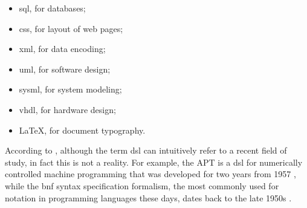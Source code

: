 \begin{itemize}
     \item \ac{sql}, for databases;
     \item \ac{css}, for layout of web pages;
     \item \ac{xml}, for data encoding;
     \item \ac{uml}, for software design;
     \item \ac{sysml}, for system modeling;
     \item \ac{vhdl}, for hardware design;
     \item \LaTeX, for document typography.
\end{itemize}

According to \cite{Faveri:2013}, although the term \ac{dsl} can intuitively refer to a recent field of study, in fact this is not a reality.
For example, the APT is a \ac{dsl} for numerically controlled machine programming that was developed for two years from 1957 \cite{Ross:1978}, while the \ac{bnf} syntax specification formalism, the most commonly used for notation in programming languages these days, dates back to the late 1950s \cite{Backus:1959}.
    
